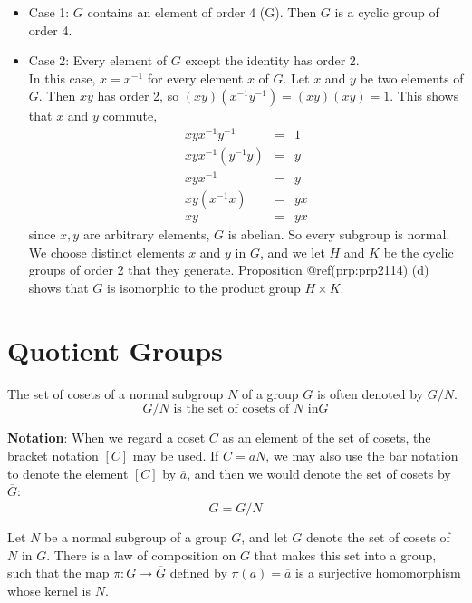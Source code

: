 \documentclass[
]{book}
\providecommand{\tightlist}{%
  \setlength{\itemsep}{0pt}\setlength{\parskip}{0pt}}
\begin{document}
\begin{itemize}
\tightlist
\item
  Case 1: \(G\) contains an element of order 4 (\textbar G).
  Then \(G\) is a cyclic group of order 4.
\item
  Case 2: Every element of \(G\) except the identity has order 2.\\
  In this case, \(x = x^{-1}\) for every element \(x\) of \(G\). Let
  \(x\) and \(y\) be two elements of \(G\). Then \(xy\) has order 2, so
  \((xy)(x^{-1}y^{-1}) = (xy)(xy) = 1\). This shows that \(x\) and \(y\)
  commute, \begin{eqnarray}
  xyx^{-1}y^{-1} &=& 1\\
  xyx^{-1}(y^{-1} y)&=& y\\
  xyx^{-1}&=& y\\
  xy(x^{-1}x)&=& yx\\
  xy &=& yx
  \end{eqnarray} since \(x,y\) are arbitrary elements, \(G\) is abelian.
  So every subgroup is normal. We choose distinct elements \(x\) and
  \(y\) in \(G\), and we let \(H\) and \(K\) be the cyclic groups of
  order 2 that they generate. Proposition @ref(prp:prp2114) (d) shows
  that \(G\) is isomorphic to the product group \(H \times K\).
\end{itemize}

\hypertarget{quotient-groups}{%
\section{Quotient Groups}\label{quotient-groups}}

\leavevmode{}%
The set of cosets of a normal subgroup \(N\) of a group \(G\) is often
denoted by \(G / N\). \[G / N \text{ is the set of cosets of $N$ in} G\]

\textbf{Notation}: When we regard a coset \(C\) as an element of the set
of cosets, the bracket notation \([C]\) may be used. If \(C = aN\), we
may also use the bar notation to denote the element \([C]\) by
\(\overline{a}\), and then we would denote the set of cosets by
\(\overline{G}\): \[\overline{G} = G /N\]

\leavevmode{}%
Let \(N\) be a normal subgroup of a group \(G\), and let \(G\) denote
the set of cosets of \(N\) in \(G\). There is a law of composition on
\(G\) that makes this set into a group, such that the map
\(\pi: G \to \overline{G}\) defined by \(\pi(a) = \overline{a}\) is a
surjective homomorphism whose kernel is \(N\).
\end{document}
